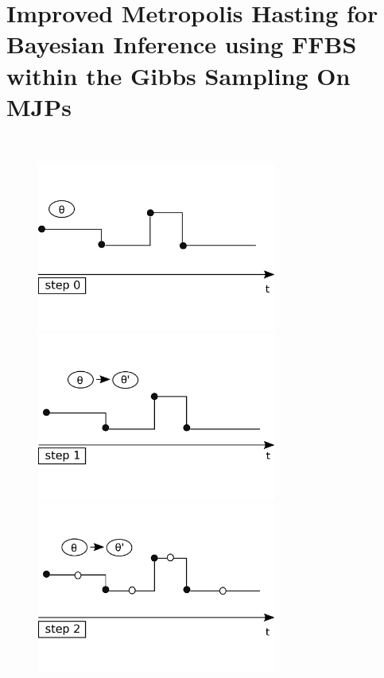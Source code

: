 
\section{Improved Metropolis Hasting for Bayesian Inference using FFBS  within the Gibbs Sampling On MJPs}~
\setlength{\unitlength}{0.8cm}
  \begin{figure}[H]
  \centering
  \begin{minipage}[!hp]{0.45\linewidth}
  \centering
    \includegraphics [width=0.70\textwidth, angle=0]{figs/plot0.pdf}
      \end{minipage}
  \begin{minipage}[hp]{0.45\linewidth}
  \centering
    \includegraphics [width=0.70\textwidth, angle=0]{figs/plot1.pdf}
    \vspace{-0 in}
  \end{minipage}
  \begin{minipage}[hp]{0.45\linewidth}
  \centering
    \includegraphics [width=0.70\textwidth, angle=0]{figs/plot2.pdf}

\end{minipage}
\end{figure}
